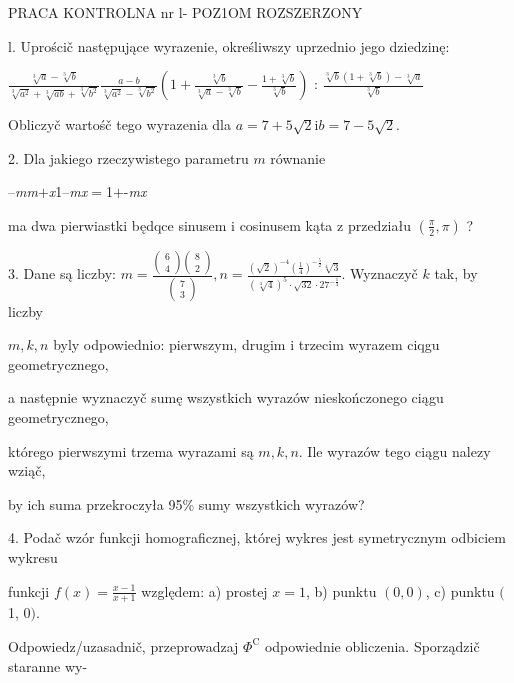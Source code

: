 \documentclass[a4paper,12pt]{article}
\begin{document}
PRACA KONTROLNA nr l- POZ1OM ROZSZERZONY

l. Uprościč następujące wyrazenie, określiwszy uprzednio jego dziedzinę:

$\displaystyle \frac{\sqrt[3]{a}-\sqrt[3]{b}}{\sqrt[3]{a^{2}}+\sqrt[3]{ab}+\sqrt[3]{b^{2}}} \displaystyle \frac{a-b}{\sqrt[3]{a^{2}}-\sqrt[3]{b^{2}}} (1+\displaystyle \frac{\sqrt[3]{b}}{\sqrt[3]{a}-\sqrt[3]{b}}-\frac{1+\sqrt[3]{b}}{\sqrt[3]{b}})$ : $\displaystyle \frac{\sqrt[3]{b}(1+\sqrt[3]{b})-\sqrt[3]{a}}{\sqrt[3]{b}}$

Obliczyč wartośč tego wyrazenia dla $a=7+5\sqrt{2} \mathrm{i} b=7-5\sqrt{2}.$

2. Dla jakiego rzeczywistego parametru $m$ równanie

--{\it mm}$+${\it x}1--{\it mx}$=$1$+$-{\it mx}

ma dwa pierwiastki będqce sinusem $\mathrm{i}$ cosinusem kąta $\mathrm{z}$ przedziału $(\displaystyle \frac{\pi}{2},\pi)$ ?

3. Dane są liczby: $m= \displaystyle \frac{\left(\begin{array}{l}
6\\
4
\end{array}\right)\left(\begin{array}{l}
8\\
2
\end{array}\right)}{\left(\begin{array}{l}
7\\
3
\end{array}\right)}, n= \displaystyle \frac{(\sqrt{2})^{-4}(\frac{1}{4})^{-\frac{5}{2}}\sqrt[4]{3}}{(\sqrt[4]{4})^{5}\cdot\sqrt{32}\cdot 27^{-\frac{1}{4}}}$. Wyznaczyč $k$ tak, by liczby

$m, k, n$ byly odpowiednio: pierwszym, drugim $\mathrm{i}$ trzecim wyrazem ciqgu geometrycznego,

a następnie wyznaczyč sumę wszystkich wyrazów nieskończonego ciągu geometrycznego,

którego pierwszymi trzema wyrazami są $m, k, n$. Ile wyrazów tego ciągu nalezy wziąč,

by ich suma przekroczyła 95\% sumy wszystkich wyrazów?

4. Podač wzór funkcji homograficznej, której wykres jest symetrycznym odbiciem wykresu

funkcji $f(x)=\displaystyle \frac{x-1}{x+1}$ względem: a) prostej $x=1$, b) punktu $(0,0)$, c) punktu $($1, $0).$

Odpowiedz/uzasadnič, przeprowadzaj $\Phi^{\mathrm{C}}$ odpowiednie obliczenia. Sporządzič staranne wy-
\end{document}
